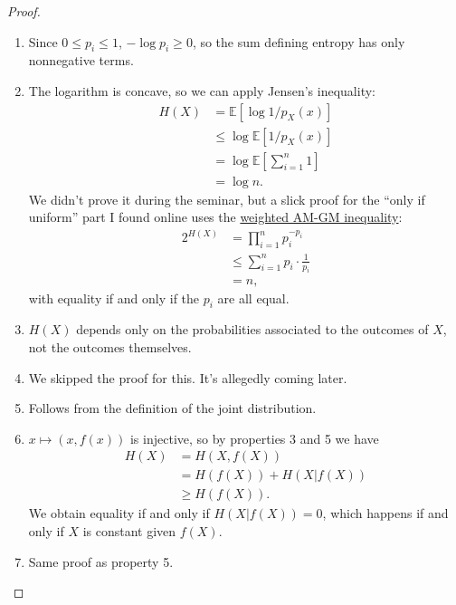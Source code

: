 \documentclass[11pt,letterpaper]{article}
\newcommand{\E}{\mathbb{E}}
\theoremstyle{plain}
\theoremstyle{definition}
\begin{document}
\begin{proof}
	\begin{enumerate}
		\item Since $0\leq p_i\leq 1$, $-\log p_i \geq 0$, so the sum defining entropy has only nonnegative terms.
		\item The logarithm is concave, so we can apply Jensen's inequality:
		\begin{align*}
			H(X) &= \E[\log 1/p_X(x)]\\
			&\leq \log \E[1/p_X(x)]\\
			&= \log \E\left[\sum_{i=1}^n 1\right]\\
			&= \log n.
		\end{align*}
		We didn't prove it during the seminar, but a slick proof for the ``only if uniform'' part I found online uses the \href{https://en.wikipedia.org/wiki/Inequality_of_arithmetic_and_geometric_means#Weighted_AM.E2.80.93GM_inequality"}{weighted AM-GM inequality}:
		\begin{align*}
		 	2^{H(X)} &= \prod_{i=1}^np_i^{-p_i}\\
		 	&\leq \sum_{i=1}^n p_i \cdot \frac{1}{p_i}\\
		 	&= n,
		\end{align*} 
		with equality if and only if the $p_i$ are all equal.
		\item $H(X)$ depends only on the probabilities associated to the outcomes of $X$, not the outcomes themselves.
		\item We skipped the proof for this. It's allegedly coming later.
		\item Follows from the definition of the joint distribution.
		\item $x\mapsto (x, f(x))$ is injective, so by properties 3 and 5 we have
		\begin{align*}
			H(X) &= H(X, f(X))\\
			&= H(f(X)) + H(X|f(X))\\
			&\geq H(f(X)).
		\end{align*}
		We obtain equality if and only if $H(X|f(X)) = 0$, which happens if and only if $X$ is constant given $f(X)$.
		\item Same proof as property 5.
	\end{enumerate}
\end{proof}
\end{document}
